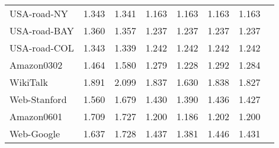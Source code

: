 \documentclass[11pt]{article}
\begin{document}
\begin{table}[!ht]
\begin{adjustbox}{width=\textwidth,totalheight=\textheight,keepaspectratio}
\begin{small}
\begin{tabular}{l|c|cccccc}
USA-road-NY                         & 1.343                                               & 1.341                                                  & 1.163                                  & 1.163                                  & 1.163                                      & 1.163                                      \\
USA-road-BAY                        & 1.360                                               & 1.357                                                  & 1.237                                  & 1.237                                  & 1.237                                      & 1.237                                      \\
USA-road-COL                        & 1.343                                               & 1.339                                                  & 1.242                                  & 1.242                                  & 1.242                                      & 1.242                                      \\
Amazon0302                          & 1.464                                               & 1.580                                                  & 1.279                                  & 1.228                                  & 1.292                                      & 1.284                                      \\
WikiTalk                            & 1.891                                               & 2.099                                                  & 1.837                                  & 1.630                                  & 1.838                                      & 1.827                                      \\
Web-Stanford                        & 1.560                                               & 1.679                                                  & 1.430                                  & 1.390                                  & 1.436                                      & 1.427                                      \\
Amazon0601                          & 1.709                                               & 1.727                                                  & 1.200                                  & 1.186                                  & 1.202                                      & 1.200                                      \\
Web-Google                          & 1.637                                               & 1.728                                                  & 1.437                                  & 1.381                                  & 1.446                                      & 1.431                                      \\

\end{tabular}
\end{small}
\end{adjustbox}
\end{table}
\end{document}
